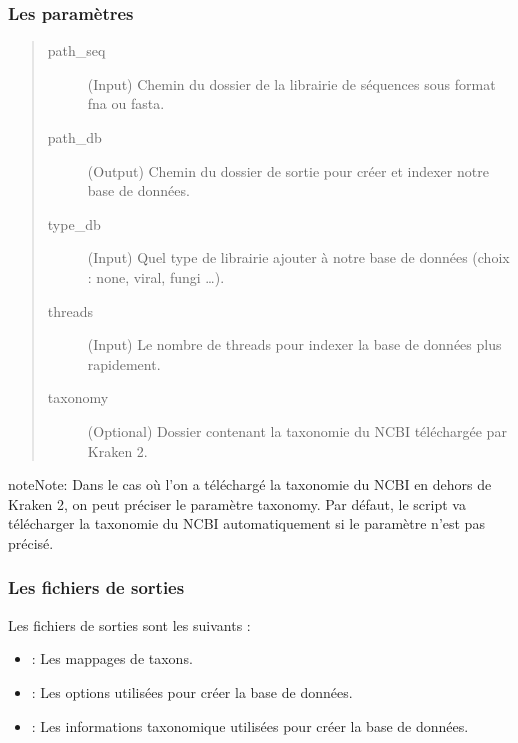 \documentclass[letterpaper,10pt,french]{sphinxmanual}
\begin{document}
\subsubsection{Les paramètres}
\label{\detokenize{tutorial:id22}}\begin{quote}\begin{description}
\item[{\sphinxhyphen{}path\_seq}] \leavevmode
(Input) Chemin du dossier de la librairie de séquences sous format fna ou fasta.

\item[{\sphinxhyphen{}path\_db}] \leavevmode
(Output) Chemin du dossier de sortie pour créer et indexer notre base de données.

\item[{\sphinxhyphen{}type\_db}] \leavevmode
(Input) Quel type de librairie ajouter à notre base de données (choix : none, viral, fungi …).

\item[{\sphinxhyphen{}threads}] \leavevmode
(Input) Le nombre de threads pour indexer la base de données plus rapidement.

\item[{\sphinxhyphen{}taxonomy}] \leavevmode
(Optional) Dossier contenant la taxonomie du NCBI téléchargée par Kraken 2.

\end{description}\end{quote}

\begin{sphinxadmonition}{note}{Note:}
Dans le cas où l’on a téléchargé la taxonomie du NCBI en dehors de Kraken 2, on peut préciser le paramètre \sphinxhyphen{}taxonomy. Par défaut, le script va télécharger la taxonomie du NCBI automatiquement si le paramètre n’est pas précisé.
\end{sphinxadmonition}


\subsubsection{Les fichiers de sorties}
\label{\detokenize{tutorial:id23}}
Les fichiers de sorties sont les suivants :
\begin{itemize}
\item {} 
 : Les mappages de taxons.

\item {} 
 : Les options utilisées pour créer la base de données.

\item {} 
 : Les informations taxonomique utilisées pour créer la base de données.

\end{itemize}
\end{document}
